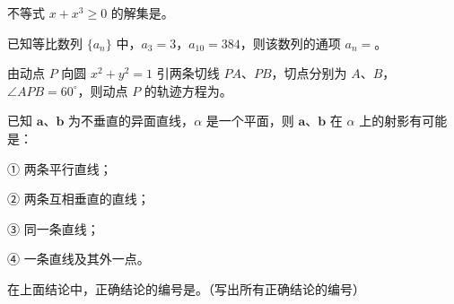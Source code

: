 \begin{question}
不等式 $x+x^3\geqslant0$ 的解集是\gkblank{}。

\end{question}
\begin{question}
已知等比数列 $\{a_n\}$ 中，$a_3=3$，$a_{10}=384$，则该数列的通项 $a_n=$\gkblank{}。

\end{question}
\begin{question}
由动点 $P$ 向圆 $x^2+y^2=1$ 引两条切线 $PA\text{、}PB$，切点分别为 $A\text{、}B$，$\angle APB=60^\circ$，则动点 $P$ 的轨迹方程为\gkblank{}。

\end{question}
\begin{question}
已知 $\boldsymbol a\text{、}\boldsymbol b$ 为不垂直的异面直线，$\alpha$ 是一个平面，则 $\boldsymbol a\text{、}\boldsymbol b$ 在 $\alpha$ 上的射影有可能是：

① 两条平行直线；

② 两条互相垂直的直线；

③ 同一条直线；

④ 一条直线及其外一点。

在上面结论中，正确结论的编号是\gkblank{}。（写出所有正确结论的编号）

\end{question}

